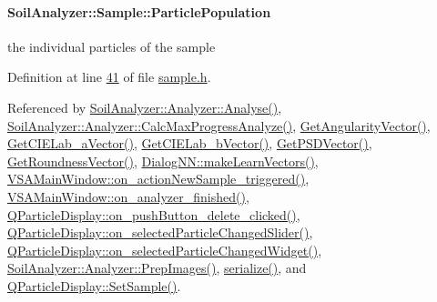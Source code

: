\hypertarget{class_soil_analyzer_1_1_sample_a877bf12069fe09d2c8f9636f19ed5335}{}
\paragraph[{Particle\+Population}]{ Soil\+Analyzer\+::\+Sample\+::\+Particle\+Population}\label{class_soil_analyzer_1_1_sample_a877bf12069fe09d2c8f9636f19ed5335}
the individual particles of the sample 

Definition at line \hyperlink{sample_8h_source_l00041}{41} of file \hyperlink{sample_8h_source}{sample.\+h}.



Referenced by \hyperlink{analyzer_8cpp_source_l00065}{Soil\+Analyzer\+::\+Analyzer\+::\+Analyse()}, \hyperlink{analyzer_8cpp_source_l00136}{Soil\+Analyzer\+::\+Analyzer\+::\+Calc\+Max\+Progress\+Analyze()}, \hyperlink{sample_8cpp_source_l00072}{Get\+Angularity\+Vector()}, \hyperlink{sample_8cpp_source_l00094}{Get\+C\+I\+E\+Lab\+\_\+a\+Vector()}, \hyperlink{sample_8cpp_source_l00104}{Get\+C\+I\+E\+Lab\+\_\+b\+Vector()}, \hyperlink{sample_8cpp_source_l00061}{Get\+P\+S\+D\+Vector()}, \hyperlink{sample_8cpp_source_l00083}{Get\+Roundness\+Vector()}, \hyperlink{dialognn_8cpp_source_l00097}{Dialog\+N\+N\+::make\+Learn\+Vectors()}, \hyperlink{vsamainwindow_8cpp_source_l00361}{V\+S\+A\+Main\+Window\+::on\+\_\+action\+New\+Sample\+\_\+triggered()}, \hyperlink{vsamainwindow_8cpp_source_l00275}{V\+S\+A\+Main\+Window\+::on\+\_\+analyzer\+\_\+finished()}, \hyperlink{qparticledisplay_8cpp_source_l00096}{Q\+Particle\+Display\+::on\+\_\+push\+Button\+\_\+delete\+\_\+clicked()}, \hyperlink{qparticledisplay_8cpp_source_l00124}{Q\+Particle\+Display\+::on\+\_\+selected\+Particle\+Changed\+Slider()}, \hyperlink{qparticledisplay_8cpp_source_l00110}{Q\+Particle\+Display\+::on\+\_\+selected\+Particle\+Changed\+Widget()}, \hyperlink{analyzer_8cpp_source_l00033}{Soil\+Analyzer\+::\+Analyzer\+::\+Prep\+Images()}, \hyperlink{sample_8h_source_l00085}{serialize()}, and \hyperlink{qparticledisplay_8cpp_source_l00035}{Q\+Particle\+Display\+::\+Set\+Sample()}.

\hypertarget{class_soil_analyzer_1_1_sample_a3a2cd7007e7867a6b3fb346f51b2ba60}{}
